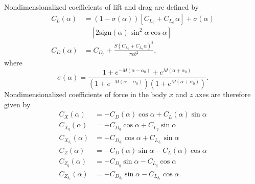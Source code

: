 \documentclass[letterpaper, 10 pt, conference]{ieeeconf}  %
\begin{document}
\begin{appendices}
Nondimensionalized coefficients of lift and drag are defined by
\begin{align}
C_{L}\left(\alpha\right) & =\left(1-\sigma\left(\alpha\right)\right)\left[C_{L_{0}}+C_{L_{\alpha}}\alpha\right]+\sigma\left(\alpha\right) \\ & \quad \left[2\mathrm{sign}\left(\alpha\right)\sin^{2}\alpha\cos\alpha\right]\nonumber\\
C_{D}\left(\alpha\right) & =C_{D_{p}}+\frac{S\left(C_{L_{0}}+C_{L_{\alpha}}\alpha\right)^{2}}{\pi eb^{2}},
\end{align}
where
\begin{equation}
\sigma\left(\alpha\right) =\frac{1+e^{-M\left(\alpha-\alpha_{0}\right)}+e^{M\left(\alpha+\alpha_{0}\right)}}{\left(1+e^{-M\left(\alpha-\alpha_{0}\right)}\right)\left(1+e^{M\left(\alpha+\alpha_{0}\right)}\right)}.
\end{equation}
Nondimensionalized coefficients of force in the body $x$ and $z$ axes are therefore given by
\begin{align}
C_{X}\left(\alpha\right) & =-C_{D}\left(\alpha\right)\cos\alpha+C_{L}\left(\alpha\right)\sin\alpha\\
C_{X_{q}}\left(\alpha\right) & =-C_{D_{q}}\cos\alpha+C_{L_{q}}\sin\alpha\\
C_{X_{\delta_{e}}}\left(\alpha\right) & =-C_{D_{\delta_{e}}}\cos\alpha+C_{L_{\delta_{e}}}\sin\alpha\\
C_{Z}\left(\alpha\right) & =-C_{D}\left(\alpha\right)\sin\alpha-C_{L}\left(\alpha\right)\cos\alpha\\
C_{Z_{q}}\left(\alpha\right) & =-C_{D_{q}}\sin\alpha-C_{L_{q}}\cos\alpha\\
C_{Z_{\delta_{e}}}\left(\alpha\right) & =-C_{D_{\delta_{e}}}\sin\alpha-C_{L_{\delta_{e}}}\cos\alpha.
\end{align}


\end{appendices}
\end{document}
